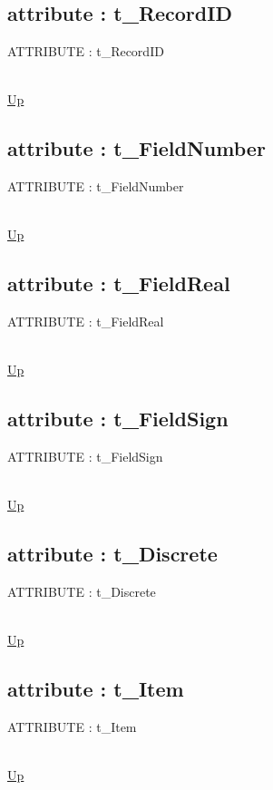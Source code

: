 \subsection*{attribute : t\_RecordID}
\hypertarget{ecldoc:ml_core.types.t_recordid}{ATTRIBUTE : t\_RecordID} \\
\hyperlink{ecldoc:ML_Core.Types}{Up} \\
\par
\subsection*{attribute : t\_FieldNumber}
\hypertarget{ecldoc:ml_core.types.t_fieldnumber}{ATTRIBUTE : t\_FieldNumber} \\
\hyperlink{ecldoc:ML_Core.Types}{Up} \\
\par
\subsection*{attribute : t\_FieldReal}
\hypertarget{ecldoc:ml_core.types.t_fieldreal}{ATTRIBUTE : t\_FieldReal} \\
\hyperlink{ecldoc:ML_Core.Types}{Up} \\
\par
\subsection*{attribute : t\_FieldSign}
\hypertarget{ecldoc:ml_core.types.t_fieldsign}{ATTRIBUTE : t\_FieldSign} \\
\hyperlink{ecldoc:ML_Core.Types}{Up} \\
\par
\subsection*{attribute : t\_Discrete}
\hypertarget{ecldoc:ml_core.types.t_discrete}{ATTRIBUTE : t\_Discrete} \\
\hyperlink{ecldoc:ML_Core.Types}{Up} \\
\par
\subsection*{attribute : t\_Item}
\hypertarget{ecldoc:ml_core.types.t_item}{ATTRIBUTE : t\_Item} \\
\hyperlink{ecldoc:ML_Core.Types}{Up} \\
\par
